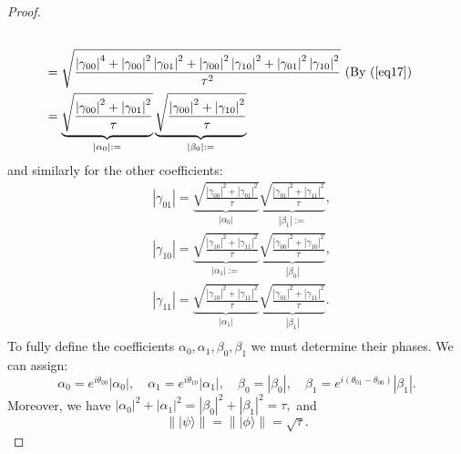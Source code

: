 \begin{example}
\begin{proof}
\begin{equation}
\begin{aligned}
{    } \\
    & =\sqrt{
    \frac{\left|\gamma_{00}\right|^4+\left|\gamma_{00}\right|^2\left|\gamma_{01}\right|^2+\left|\gamma_{00}\right|^2\left|\gamma_{10}\right|^2+\left|\gamma_{01}\right|^2\left|\gamma_{10}\right|^2}{\tau^2}
    }  \text{ (By (\ref{eq17}) } \\
    & =
    \underbrace{
    \sqrt{\frac{\left|\gamma_{00}\right|^2+\left|\gamma_{01}\right|^2}{\tau}}
    }_{\left|\alpha_0\right|:=} 
    \underbrace{
    \sqrt{\frac{\left|\gamma_{00}\right|^2+\left|\gamma_{10}\right|^2}{\tau}}
    }_{\left|\beta_0\right|:=} 
    \end{aligned}
    \end{equation}
    and similarly for the other coefficients:
    \begin{equation}
    \begin{aligned}
    & \left|\gamma_{01}\right|
    =\underbrace{
    \sqrt{\frac{\left|\gamma_{00}\right|^2+\left|\gamma_{01}\right|^2}{\tau}}
    }_{\left|\alpha_0\right|}
    \underbrace{
    \sqrt{\frac{\left|\gamma_{01}\right|^2+\left|\gamma_{11}\right|^2}{\tau}}
    }_{\left|\beta_1\right|:=}, \\
    & \left|\gamma_{10}\right|
    =\underbrace{
    \sqrt{\frac{\left|\gamma_{10}\right|^2+\left|\gamma_{11}\right|^2}{\tau}}
    }_{\left|\alpha_1\right|:=}
    \underbrace{
    \sqrt{\frac{\left|\gamma_{00}\right|^2+\left|\gamma_{10}\right|^2}{\tau}}
    }_{\left|\beta_0\right|}, \\
    & \left|\gamma_{11}\right|
    =\underbrace{
    \sqrt{\frac{\left|\gamma_{10}\right|^2+\left|\gamma_{11}\right|^2}{\tau}}
    }_{\left|\alpha_1\right|}
    \underbrace{
    \sqrt{\frac{\left|\gamma_{01}\right|^2+\left|\gamma_{11}\right|^2}{\tau}}
    }_{\left|\beta_1\right|}. \\
    &
    \end{aligned}
    \end{equation}
    To fully define the coefficients $\alpha_0, \alpha_1, \beta_0, \beta_1$ we must determine their phases. We can assign:
	\begin{equation}
    \alpha_0=e^{i \theta_{00}}\left|\alpha_0\right|, \quad \alpha_1=e^{i \theta_{10}}\left|\alpha_1\right|, \quad \beta_0=\left|\beta_0\right|, \quad \beta_1=e^{i\left(\theta_{01}-\theta_{00}\right)}\left|\beta_1\right| .
    \end{equation}
    Moreover, we have 
    $
    \left|\alpha_0\right|^2+\left|\alpha_1\right|^2=\left|\beta_0\right|^2+\left|\beta_1\right|^2=\tau,
    $
    and
    \begin{equation}\label{tau}
        \left\| | \psi\rangle \right\|  = \left\|  |\phi\rangle \right\|  = \sqrt{\tau}.
    \end{equation}


\end{proof}
\end{example}
